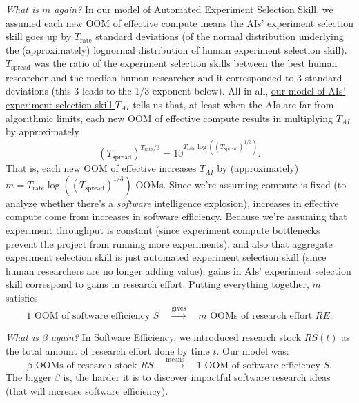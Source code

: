 \documentclass{article}
\theoremstyle{definition}
\begin{document}
\textit{What is $m$ again?} In our model of \hyperref[Automated experiment selection skill]{Automated Experiment Selection Skill}, we assumed each new OOM of effective compute means the AIs' experiment selection skill goes up by $T_\text{rate}$ standard deviations (of the normal distribution underlying the (approximately) lognormal distribution of human experiment selection skill). $T_\text{spread}$ was the ratio of the experiment selection skills between the best human researcher and the median human researcher and it corresponded to 3 standard deviations (this 3 leads to the 1/3 exponent below). All in all, \hyperref[Automated experiment selection skill]{our model of AIs' experiment selection skill $T_{AI}$} tells us that, at least when the AIs are far from algorithmic limits, each new OOM of effective compute results in multiplying $T_{AI}$ by approximately
\[ \left(T_\text{spread}\right)^{T_\text{rate}/3} = 10^{T_\text{rate} \log(\left(T_\text{spread}\right)^{1/3})}.\]
That is, each new OOM of effective increases $T_{AI}$ by (approximately) $m = T_\text{rate} \log(\left(T_\text{spread}\right)^{1/3})$ OOMs. Since we're assuming compute is fixed (to analyze whether there's a \textit{software} intelligence explosion), increases in effective compute come from increases in software efficiency. Because we're assuming that experiment throughput is constant (since experiment compute bottlenecks prevent the project from running more experiments), and also that aggregate experiment selection skill is just automated experiment selection skill (since human researchers are no longer adding value), gains in AIs' experiment selection skill correspond to gains in research effort. Putting everything together, $m$ satisfies
\begin{equation} \label{m}
\text{1 OOM of software efficiency $S$} \quad \xrightarrow{\text{gives}} \quad \text{$m$ OOMs of research effort $RE$}.
\end{equation}

\textit{What is $\beta$ again?} In \hyperref[Software efficiency]{Software Efficiency}, we introduced research stock $RS(t)$ as the total amount of research effort done by time $t$. Our model was:
\begin{equation} \label{RS to S}
\text{$\beta$ OOMs of research stock $RS$} \quad \xrightarrow{\text{means}} \quad \text{1 OOM of software efficiency $S$}.
\end{equation}
The bigger $\beta$ is, the harder it is to discover impactful software research ideas (that will increase software efficiency).
\end{document}
